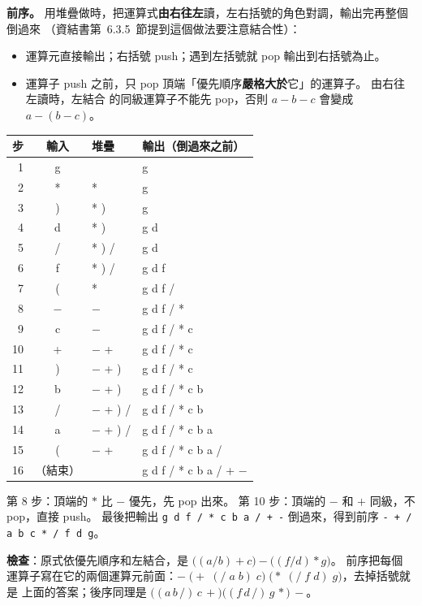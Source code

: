 \begin{pastsoln}
\textbf{前序。} 用堆疊做時，把運算式\textbf{由右往左}讀，左右括號的角色對調，輸出完再整個倒過來
（資結書第~6.3.5~節提到這個做法要注意結合性）：
\begin{itemize}
\item 運算元直接輸出；右括號 push；遇到左括號就 pop 輸出到右括號為止。
\item 運算子 push 之前，只 pop 頂端「優先順序\textbf{嚴格大於}它」的運算子。 由右往左讀時，左結合
的同級運算子不能先 pop，否則 $a - b - c$ 會變成 $a - (b - c)$。
\end{itemize}
\begin{center}
\small
\begin{tabular}{rcll}
\toprule
步 & 輸入 & 堆疊 & 輸出（倒過來之前） \\
\midrule
1 & g & & g \\
2 & * & * & g \\
3 & ) & * ) & g \\
4 & d & * ) & g d \\
5 & / & * ) / & g d \\
6 & f & * ) / & g d f \\
7 & ( & * & g d f / \\
8 & $-$ & $-$ & g d f / * \\
9 & c & $-$ & g d f / * c \\
10 & + & $-$ + & g d f / * c \\
11 & ) & $-$ + ) & g d f / * c \\
12 & b & $-$ + ) & g d f / * c b \\
13 & / & $-$ + ) / & g d f / * c b \\
14 & a & $-$ + ) / & g d f / * c b a \\
15 & ( & $-$ + & g d f / * c b a / \\
16 & （結束） & & g d f / * c b a / + $-$ \\
\bottomrule
\end{tabular}
\end{center}
第 8 步：頂端的 $*$ 比 $-$ 優先，先 pop 出來。 第 10 步：頂端的 $-$ 和 $+$ 同級，不 pop，直接 push。
最後把輸出 \texttt{g d f / * c b a / + -} 倒過來，得到前序 \texttt{- + / a b c * / f d g}。

\textbf{檢查}：原式依優先順序和左結合，是 $\bigl((a/b) + c\bigr) - \bigl((f/d) * g\bigr)$。 前序把每個
運算子寫在它的兩個運算元前面：$-\;\bigl(+\;(/\;a\;b)\;c\bigr)\;\bigl(*\;(/\;f\;d)\;g\bigr)$，去掉括號就是
上面的答案；後序同理是 $\bigl((a\,b\,/)\,c\,+\bigr)\bigl((f\,d\,/)\,g\,*\bigr)\,-$。
\end{pastsoln}
